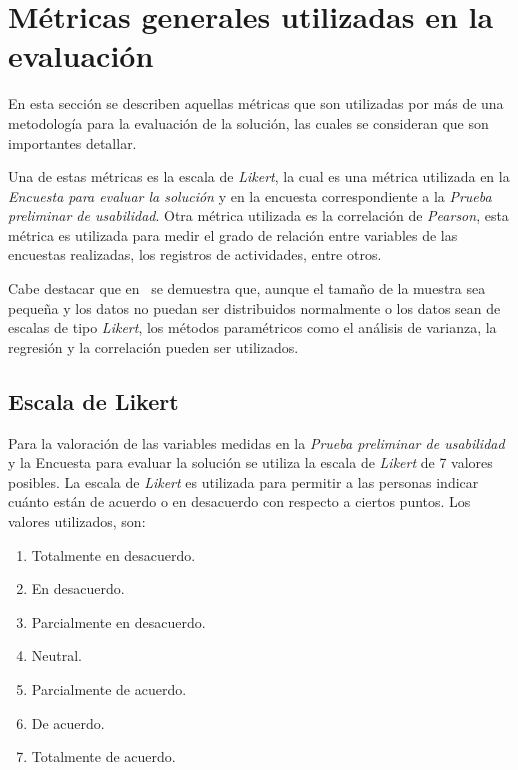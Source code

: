 
\section{Métricas generales utilizadas en la evaluación}

En esta sección se describen aquellas métricas que son utilizadas por más de una
metodología para la evaluación de la solución, las cuales se consideran que son
importantes detallar.

Una de estas métricas es la escala de \textit{Likert}, la cual es una métrica
utilizada en la \emph{Encuesta para evaluar la solución} y en la encuesta
correspondiente a la \emph{Prueba preliminar de usabilidad}. Otra métrica
utilizada es la correlación de \textit{Pearson}, esta métrica es utilizada para
medir el grado de relación entre variables de las encuestas realizadas, los
registros de actividades, entre otros.

Cabe destacar que en~\cite{norman2010likert} se demuestra que, aunque el tamaño
de la muestra sea pequeña y los datos no puedan ser distribuidos normalmente o
los datos sean de escalas de tipo \textit{Likert}, los métodos paramétricos como
el análisis de varianza, la regresión y la correlación pueden ser utilizados.


\subsection{Escala de Likert}
\label{sec:likert}

Para la valoración de las variables medidas en la \emph{Prueba preliminar de
    usabilidad} y la {Encuesta para evaluar la solución} se utiliza la escala de
\textit{Likert}\cite{Allen:2007} de 7 valores posibles. La escala de
\textit{Likert} es utilizada para permitir a las personas indicar cuánto están
de acuerdo o en desacuerdo con respecto a ciertos puntos. Los valores
utilizados, son:

\begin{enumerate}
    \item Totalmente en desacuerdo.
    \item En desacuerdo.
    \item Parcialmente en desacuerdo.
    \item Neutral.
    \item Parcialmente de acuerdo.
    \item De acuerdo.
    \item Totalmente de acuerdo.
\end{enumerate}

